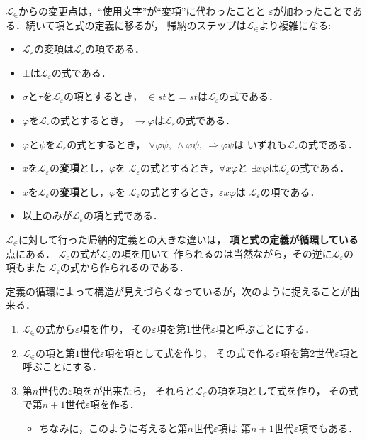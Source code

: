 	$\mathcal{L}_{\in}$からの変更点は，``使用文字''が``変項''に代わったことと
	$\varepsilon$が加わったことである．続いて項と式の定義に移るが，
	帰納のステップは$\mathcal{L}_{\in}$より複雑になる:
	
	\begin{itemize}
		\item $\mathcal{L}_{\varepsilon}$の変項は$\mathcal{L}_{\varepsilon}$の項である．
		\item $\bot$は$\mathcal{L}_{\varepsilon}$の式である．
		\item $\sigma$と$\tau$を$\mathcal{L}_{\varepsilon}$の項とするとき，
			$\in st$と$=st$は$\mathcal{L}_{\varepsilon}$の式である．
		\item $\varphi$を$\mathcal{L}_{\varepsilon}$の式とするとき，
			$\rightharpoondown \varphi$は$\mathcal{L}_{\varepsilon}$の式である．
		\item $\varphi$と$\psi$を$\mathcal{L}_{\varepsilon}$の式とするとき，
			$\vee \varphi \psi,\ \wedge \varphi \psi,\ \Longrightarrow \varphi \psi$は
			いずれも$\mathcal{L}_{\varepsilon}$の式である．
		\item $x$を$\mathcal{L}_{\varepsilon}$の{\bf 変項}とし，$\varphi$を
			$\mathcal{L}_{\varepsilon}$の式とするとき，$\forall x \varphi$と
			$\exists x \varphi$は$\mathcal{L}_{\varepsilon}$の式である．
		\item $x$を$\mathcal{L}_{\varepsilon}$の{\bf 変項}とし，$\varphi$を
			$\mathcal{L}_{\varepsilon}$の式とするとき，$\varepsilon x \varphi$は
			$\mathcal{L}_{\varepsilon}$の項である．
		\item 以上のみが$\mathcal{L}_{\varepsilon}$の項と式である．
	\end{itemize}
	
	$\mathcal{L}_{\in}$に対して行った帰納的定義との大きな違いは，
	{\bf 項と式の定義が循環している}点にある．
	$\mathcal{L}_{\varepsilon}$の式が$\mathcal{L}_{\varepsilon}$の項を用いて
	作られるのは当然ながら，その逆に$\mathcal{L}_{\varepsilon}$の項もまた
	$\mathcal{L}_{\varepsilon}$の式から作られるのである．
	
	定義の循環によって構造が見えづらくなっているが，次のように捉えることが出来る．
	\begin{enumerate}
		\item $\mathcal{L}_{\in}$の式から$\varepsilon$項を作り，
			その$\varepsilon$項を第$1$世代$\varepsilon$項と呼ぶことにする．
		\item $\mathcal{L}_{\in}$の項と第$1$世代$\varepsilon$項を項として式を作り，
			その式で作る$\varepsilon$項を第$2$世代$\varepsilon$項と呼ぶことにする．
		\item 第$n$世代の$\varepsilon$項をが出来たら，
			それらと$\mathcal{L}_{\in}$の項を項として式を作り，
			その式で第$n+1$世代$\varepsilon$項を作る．
			
			\begin{itemize}
				\item ちなみに，このように考えると第$n$世代$\varepsilon$項は
					第$n+1$世代$\varepsilon$項でもある．
			\end{itemize}
	\end{enumerate}
	
